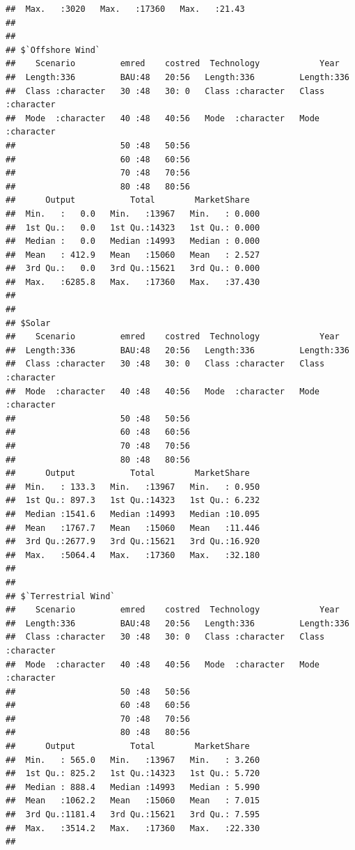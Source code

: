 \documentclass[]{article}
\begin{document}
\begin{verbatim}
##  Max.   :3020   Max.   :17360   Max.   :21.43  
##                                                
## 
## $`Offshore Wind`
##    Scenario         emred    costred  Technology            Year          
##  Length:336         BAU:48   20:56   Length:336         Length:336        
##  Class :character   30 :48   30: 0   Class :character   Class :character  
##  Mode  :character   40 :48   40:56   Mode  :character   Mode  :character  
##                     50 :48   50:56                                        
##                     60 :48   60:56                                        
##                     70 :48   70:56                                        
##                     80 :48   80:56                                        
##      Output           Total        MarketShare    
##  Min.   :   0.0   Min.   :13967   Min.   : 0.000  
##  1st Qu.:   0.0   1st Qu.:14323   1st Qu.: 0.000  
##  Median :   0.0   Median :14993   Median : 0.000  
##  Mean   : 412.9   Mean   :15060   Mean   : 2.527  
##  3rd Qu.:   0.0   3rd Qu.:15621   3rd Qu.: 0.000  
##  Max.   :6285.8   Max.   :17360   Max.   :37.430  
##                                                   
## 
## $Solar
##    Scenario         emred    costred  Technology            Year          
##  Length:336         BAU:48   20:56   Length:336         Length:336        
##  Class :character   30 :48   30: 0   Class :character   Class :character  
##  Mode  :character   40 :48   40:56   Mode  :character   Mode  :character  
##                     50 :48   50:56                                        
##                     60 :48   60:56                                        
##                     70 :48   70:56                                        
##                     80 :48   80:56                                        
##      Output           Total        MarketShare    
##  Min.   : 133.3   Min.   :13967   Min.   : 0.950  
##  1st Qu.: 897.3   1st Qu.:14323   1st Qu.: 6.232  
##  Median :1541.6   Median :14993   Median :10.095  
##  Mean   :1767.7   Mean   :15060   Mean   :11.446  
##  3rd Qu.:2677.9   3rd Qu.:15621   3rd Qu.:16.920  
##  Max.   :5064.4   Max.   :17360   Max.   :32.180  
##                                                   
## 
## $`Terrestrial Wind`
##    Scenario         emred    costred  Technology            Year          
##  Length:336         BAU:48   20:56   Length:336         Length:336        
##  Class :character   30 :48   30: 0   Class :character   Class :character  
##  Mode  :character   40 :48   40:56   Mode  :character   Mode  :character  
##                     50 :48   50:56                                        
##                     60 :48   60:56                                        
##                     70 :48   70:56                                        
##                     80 :48   80:56                                        
##      Output           Total        MarketShare    
##  Min.   : 565.0   Min.   :13967   Min.   : 3.260  
##  1st Qu.: 825.2   1st Qu.:14323   1st Qu.: 5.720  
##  Median : 888.4   Median :14993   Median : 5.990  
##  Mean   :1062.2   Mean   :15060   Mean   : 7.015  
##  3rd Qu.:1181.4   3rd Qu.:15621   3rd Qu.: 7.595  
##  Max.   :3514.2   Max.   :17360   Max.   :22.330  
## 
\end{verbatim}
\end{document}

